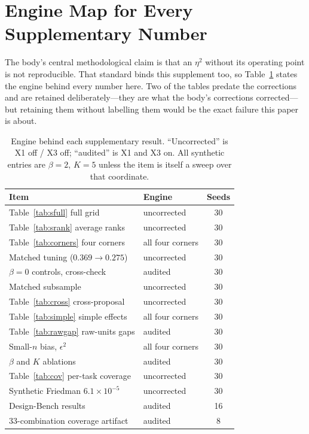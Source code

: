 \documentclass[letterpaper]{article}
\theoremstyle{plain}
\begin{document}
\section{Engine Map for Every Supplementary Number}
\label{sec:enginemap}

The body's central methodological claim is that an $\eta^2$ without its operating point is not reproducible. That standard binds this supplement too, so Table~\ref{tab:enginemap} states the engine behind every number here. Two of the tables predate the corrections and are retained deliberately---they are what the body's corrections corrected---but retaining them without labelling them would be the exact failure this paper is about.

\begin{table}[t]\centering
\caption{Engine behind each supplementary result. ``Uncorrected'' is X1 off / X3 off; ``audited'' is X1 and X3 on. All synthetic entries are $\beta{=}2$, $K{=}5$ unless the item is itself a sweep over that coordinate.}
\label{tab:enginemap}
\setlength{\tabcolsep}{4pt}\small
\begin{tabular}{llc}
\toprule
Item & Engine & Seeds \\
\midrule
Table~\ref{tab:sfull} full grid          & uncorrected & 30 \\
Table~\ref{tab:srank} average ranks      & uncorrected & 30 \\
Table~\ref{tab:corners} four corners     & all four corners & 30 \\
Matched tuning ($0.369\!\to\!0.275$)     & uncorrected & 30 \\
$\beta{=}0$ controls, cross-check        & audited     & 30 \\
Matched subsample                        & uncorrected & 30 \\
Table~\ref{tab:cross} cross-proposal     & uncorrected & 30 \\
Table~\ref{tab:simple} simple effects    & all four corners & 30 \\
Table~\ref{tab:rawgap} raw-units gaps    & audited     & 30 \\
Small-$n$ bias, $\epsilon^2$             & all four corners & 30 \\
$\beta$ and $K$ ablations                & audited     & 30 \\
Table~\ref{tab:cov} per-task coverage    & uncorrected & 30 \\
Synthetic Friedman $6.1\times10^{-5}$    & uncorrected & 30 \\
Design-Bench results                     & audited     & 16 \\
33-combination coverage artifact         & audited     & 8 \\
\bottomrule
\end{tabular}
\end{table}
\end{document}
